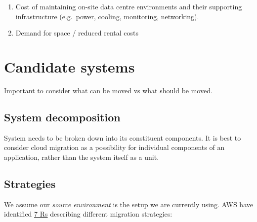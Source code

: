 \documentclass[slides]{pgnotes}
\begin{document}
\begin{enumerate}
\def\labelenumi{\arabic{enumi}.}
\item
  Cost of maintaining on-site data centre environments and their
  supporting infrastructure (e.g.~power, cooling, monitoring,
  networking).
\item
  Demand for space / reduced rental costs
\end{enumerate}

\section{Candidate systems}\label{candidate-systems}

Important to consider what can be moved vs what should be moved.

\subsection{System decomposition}\label{system-decomposition}

System needs to be broken down into its constituent components. It is
best to consider cloud migration as a possibility for individual
components of an application, rather than the system itself as a unit.

\subsection{Strategies}\label{strategies}

We assume our \emph{source environment} is the setup we are currently
using. AWS have identified
\href{https://docs.aws.amazon.com/prescriptive-guidance/latest/migration-replatforming-cots-applications/apg-gloss.html}{7
Rs} describing different migration strategies:
\end{document}
